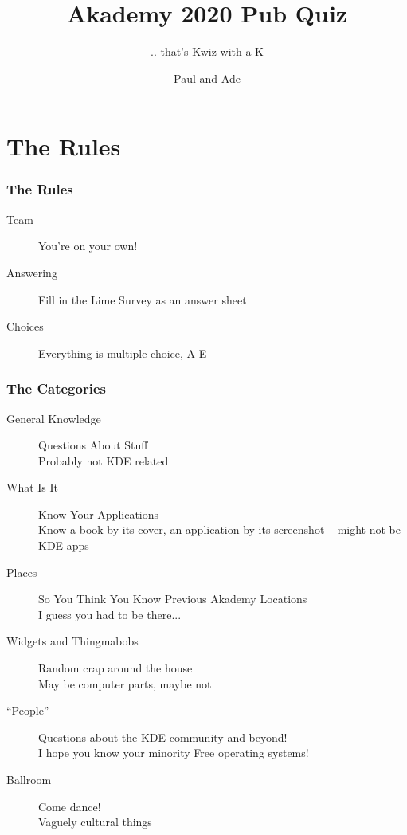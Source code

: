 \documentclass[t,compress,aspectratio=169]{beamer}
\title{Akademy 2020 Pub Quiz}
\subtitle{.. that's Kwiz with a K}
\author{Paul and Ade}
\begin{document}
\begin{withoutheadline}
\begin{frame}
\titlepage
\end{frame}
\end{withoutheadline}

\section*{The Rules}

\begin{frame}
    \frametitle{The Rules}
    \begin{description}
        \item[Team] You're on your own!
        \item[Answering] Fill in the Lime Survey as an answer sheet
        \item[Choices] Everything is multiple-choice, A-E
    \end{description}
\end{frame}

\begin{frame}
    \frametitle{The Categories}
    \begin{description}
        \item[General Knowledge] Questions About Stuff\\{\tiny{Probably not KDE related}}
        \item[What Is It] Know Your Applications\\{\tiny{Know a book by its cover, an application by its screenshot -- might not be KDE apps}}
        \item[Places] So You Think You Know Previous Akademy Locations\\{\tiny{I guess you had to be there...}}
        \item[Widgets and Thingmabobs] Random crap around the house\\{\tiny{May be computer parts, maybe not}}
        \item[``People''] Questions about the KDE community and beyond!\\{\tiny{I hope you know your minority Free operating systems!}}
        \item[Ballroom] Come dance!\\{\tiny{Vaguely cultural things}}
    \end{description}
\end{frame}
\end{document}
